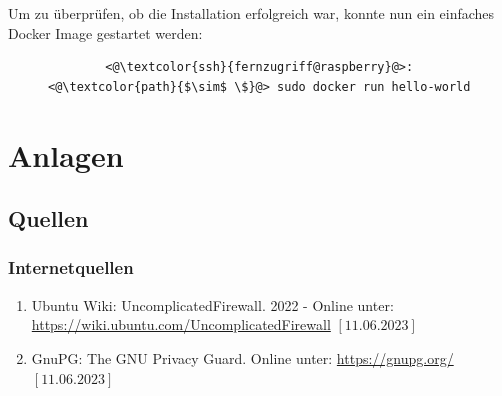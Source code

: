 \documentclass[a4paper, 11pt]{scrartcl}
\begin{document}
Um zu überprüfen, ob die Installation erfolgreich war, konnte nun ein einfaches Docker Image gestartet werden:
\begin{figure}[H]
    \begin{mdframed}[backgroundcolor=bbg]
        \begin{lstlisting}
        <@\textcolor{ssh}{fernzugriff@raspberry}@>:<@\textcolor{path}{$\sim$ \$}@> sudo docker run hello-world
        \end{lstlisting}
    \end{mdframed}
    \label{lst:setup_docker_repo}
\end{figure}

\newpage
\section{Anlagen}




\subsection{Quellen}\label{ch:src}
\subsubsection{Internetquellen}\label{ch:src_internet}
\begin{enumerate}
    \item Ubuntu Wiki: UncomplicatedFirewall. 2022 - Online unter: \newline\url{https://wiki.ubuntu.com/UncomplicatedFirewall} $\left[\text{11.06.2023}\right]$\label{src:ufw}
    \item GnuPG: The GNU Privacy Guard. Online unter: \newline\url{https://gnupg.org/} $\left[\text{11.06.2023}\right]$\label{src:gnupg}
\end{enumerate}
\begin{small}

\end{small}
\end{document}

